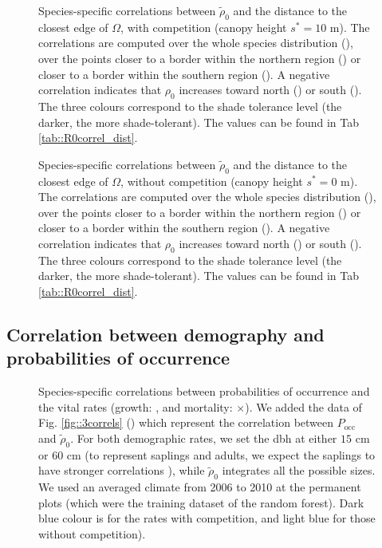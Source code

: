 \documentclass[letterpaper, 12pt]{article}
\newcommand {\s}{{s}^{*}}
\theoremstyle{theo}
\begin{document}
\begin{refsection}
\begin{onehalfspace}
\begin{figure}
	\centering
	
	\caption[$ \text{Cor}(\tilde \rho_0, \text{distance closest edge}) $, $ s^{*} = 10 $ m]{Species-specific correlations between $ \tilde \rho_0 $ and the distance to the closest edge of $ \Omega $, with competition (canopy height $ \s = 10 $ m). The correlations are computed over the whole species distribution (\CircSteel), over the points closer to a border within the northern region (\MoveUp) or closer to a border within the southern region (\MoveDown). A negative correlation indicates that $ \rho_0 $ increases toward north (\MoveUp) or south (\MoveDown). The three colours correspond to the shade tolerance level (the darker, the more shade-tolerant). The values can be found in Tab \ref{tab::R0correl_dist}. \label{fig::3correls_dist}}
\end{figure}

\begin{figure}
	\centering
	
	\caption[$ \text{Cor}(\tilde \rho_0, \text{distance closest edge}) $, no competition]{Species-specific correlations between $ \tilde \rho_0 $ and the distance to the closest edge of $ \Omega $, without competition (canopy height $ \s = 0 $ m). The correlations are computed over the whole species distribution (\CircSteel), over the points closer to a border within the northern region (\MoveUp) or closer to a border within the southern region (\MoveDown). A negative correlation indicates that $ \rho_0 $ increases toward north (\MoveUp) or south (\MoveDown). The three colours correspond to the shade tolerance level (the darker, the more shade-tolerant). The values can be found in Tab \ref{tab::R0correl_dist}. \label{fig::3correls_dist_0}}
\end{figure}

\newpage
\subsection{Correlation between demography and probabilities of occurrence}
\begin{figure}[h]
	\centering
	
	\caption[$ P_{\text{occ}} $ vs vital rates, species 1-4]{Species-specific correlations between probabilities of occurrence and the vital rates (growth: \CircSteel, and mortality: $ \times $). We added the data of Fig. \ref{fig::3correls} (\MoveUp) which represent the correlation between $ P_{\text{occ}} $ and $ \tilde \rho_0 $. For both demographic rates, we set the dbh at either $ 15 $ cm or $ 60 $ cm (to represent saplings and adults, we expect the saplings to have stronger correlations \citep{Kunstler2019}), while $ \tilde \rho_0 $ integrates all the possible sizes. We used an averaged climate from 2006 to 2010 at the permanent plots (which were the training dataset of the random forest). Dark blue colour is for the rates with competition, and light blue for those without competition). \label{fig::demog_Pocc1-4}}
\end{figure}


\end{onehalfspace}
\end{refsection}
\end{document}
